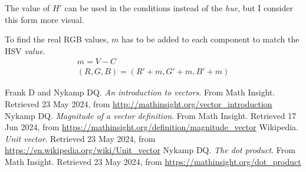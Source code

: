 \documentclass{amsart}
\begin{document}
The value of $H'$ can be used in the conditions instead of the \textit{hue}, but
I consider this form more visual.

To find the real RGB values, $m$ has to be added to each component to match the
HSV \textit{value}.
\begin{gather*}
  m = V - C \\
  (R, G, B) = (R' + m, G' + m, B' + m)
\end{gather*}


\newpage
\begin{thebibliography}{9}
  Frank D and Nykamp DQ. \textit{An introduction to vectors}. From Math
  Insight. Retrieved 23 May 2024, from
  \url{http://mathinsight.org/vector_introduction}
  Nykamp DQ. \textit{Magnitude of a vector definition}. From Math
  Insight. Retrieved 17 Jun 2024, from
  \url{https://mathinsight.org/definition/magnitude_vector}
  Wikipedia. \textit{Unit vector}. Retrieved 23 May 2024, from
  \url{https://en.wikipedia.org/wiki/Unit_vector}
  Nykamp DQ. \textit{The dot product}. From Math Insight. Retrieved 23 May 2024,
  from \url{https://mathinsight.org/dot_product}
\end{thebibliography}
\end{document}
